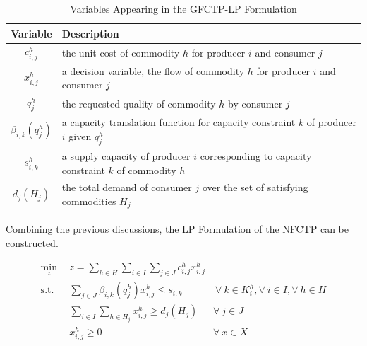 \begin{table} [h!]
\centering
\begin{tabularx}{\columnwidth-10pt}{|c|X|} %
\hline
Variable    & Description \\
\hline
$c_{i,j}^{h}$             & the unit cost of commodity $h$ 
                          for producer $i$ and consumer $j$  \\
$x_{i,j}^{h}$             & a decision variable, the flow of commodity $h$ 
                          for producer $i$ and consumer $j$  \\
$q_{j}^{h}$               & the requested quality of commodity $h$ 
                          by consumer $j$  \\
$\beta_{i,k}(q_{j}^{h})$  & a capacity translation function for capacity 
                          constraint $k$ of producer $i$ given $q_{j}^{h}$ \\
$s_{i,k}^{h}$             & a supply capacity of producer $i$ corresponding to 
                          capacity constraint $k$ of commodity $h$ \\
$d_{j}(H_{j})$            & the total demand of consumer $j$ over the set of 
                          satisfying commodities $H_{j}$ \\
\hline
\end{tabularx}
\caption{Variables Appearing in the GFCTP-LP Formulation}
\label{tbl:GFCTP-LP-vars}
\end{table}

Combining the previous discussions, the LP Formulation of the NFCTP can be constructed.

\begin{subequations}\label{eqs:GFCTP-LP}
  \begin{align}
    \min_{z} \:\: & 
    z = \sum_{h \in H}\sum_{i \in I}\sum_{j \in J}c_{i,j}^{h} x_{i,j}^{h} 
    & \label{eqs:GFCTP-LP_obj} \\
    \text{s.t.} \:\: &
    \sum_{j \in J}\beta_{i,k}(q_{j}^{h}) x_{i,j}^{h} \leq s_{i,k} 
    &
    \: \forall \: k \in K_{i}^{h},  
    \forall \: i \in I, \forall \: h \in H \label{eqs:GFCTP-LP_sup} \\
    &
    \sum_{i \in I}\sum_{h \in H_{j}} x_{i,j}^{h} \geq d_{j}(H_{j}) 
    & 
    \forall \: j \in J \label{eqs:GFCTP-LP_dem} \\
    &
    x^h_{i,j} \geq 0
    &
    \forall \: x \in X \label{eqs:GFCTP-LP_x}
  \end{align}
\end{subequations}

